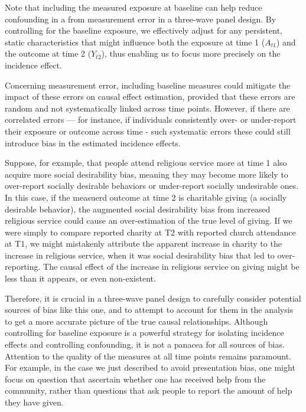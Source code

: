 \documentclass[
  singlecolumn]{report}
\begin{document}
Note that including the measured exposure at baseline can help reduce
confounding in a from measurement error in a three-wave panel design. By
controlling for the baseline exposure, we effectively adjust for any
persistent, static characteristics that might influence both the
exposure at time 1 (\(A_{t1}\)) and the outcome at time 2 (\(Y_{t2}\)),
thus enabling us to focus more precisely on the incidence effect.

Concerning measurement error, including baseline measures could mitigate
the impact of these errors on causal effect estimation, provided that
these errors are random and not systematically linked across time
points. However, if there are correlated errors --- for instance, if
individuals consistently over- or under-report their exposure or outcome
across time - such systematic errors these could still introduce bias in
the estimated incidence effects.

Suppose, for example, that people attend religious service more at time
1 also acquire more social desirability bias, meaning they may become
more likely to over-report socially desirable behaviors or under-report
socially undesirable ones. In this case, if the measuerd outcome at time
2 is charitable giving (a socially desirable behavior), the augmented
social desirability bias from increased religious service could cause an
over-estimation of the true level of giving. If we were simply to
compare reported charity at T2 with reported church attendance at T1, we
might mistakenly attribute the apparent increase in charity to the
increase in religious service, when it was social desirability bias that
led to over-reporting. The causal effect of the increase in religious
service on giving might be less than it appears, or even non-existent.

Therefore, it is crucial in a three-wave panel design to carefully
consider potential sources of bias like this one, and to attempt to
account for them in the analysis to get a more accurate picture of the
true causal relationships. Although controlling for baseline exposure is
a powerful strategy for isolating incidence effects and controlling
confounding, it is not a panacea for all sources of bias. Attention to
the quality of the measures at all time points remains paramount. For
example, in the case we just described to avoid presentation bias, one
might focus on question that ascertain whether one has received help
from the community, rather than questions that ask people to report the
amount of help they have given.
\end{document}
